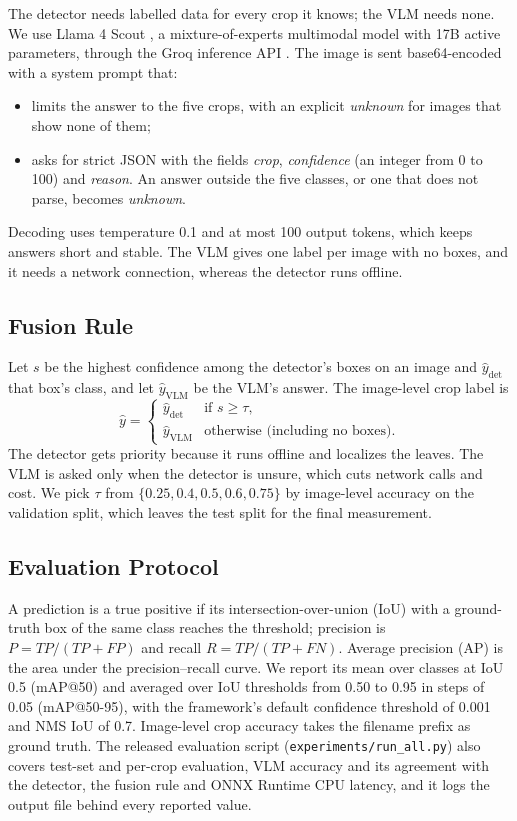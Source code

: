 \documentclass[conference]{IEEEtran}
\begin{document}
The detector needs labelled data for every crop it knows; the VLM needs none. We use Llama 4 Scout \cite{llama4}, a mixture-of-experts multimodal model with 17B active parameters, through the Groq inference API \cite{groq}. The image is sent base64-encoded with a system prompt that:
\begin{itemize}
\item limits the answer to the five crops, with an explicit \textit{unknown} for images that show none of them;
\item asks for strict JSON with the fields \textit{crop}, \textit{confidence} (an integer from 0 to 100) and \textit{reason}. An answer outside the five classes, or one that does not parse, becomes \textit{unknown}.
\end{itemize}
Decoding uses temperature 0.1 and at most 100 output tokens, which keeps answers short and stable. The VLM gives one label per image with no boxes, and it needs a network connection, whereas the detector runs offline.

\subsection{Fusion Rule}

Let $s$ be the highest confidence among the detector's boxes on an image and $\hat{y}_{\text{det}}$ that box's class, and let $\hat{y}_{\text{VLM}}$ be the VLM's answer. The image-level crop label is
\begin{equation}
\hat{y} = \begin{cases} \hat{y}_{\text{det}} & \text{if } s \ge \tau,\\ \hat{y}_{\text{VLM}} & \text{otherwise (including no boxes).} \end{cases}
\end{equation}
The detector gets priority because it runs offline and localizes the leaves. The VLM is asked only when the detector is unsure, which cuts network calls and cost. We pick $\tau$ from $\{0.25, 0.4, 0.5, 0.6, 0.75\}$ by image-level accuracy on the validation split, which leaves the test split for the final measurement.

\subsection{Evaluation Protocol}

A prediction is a true positive if its intersection-over-union (IoU) with a ground-truth box of the same class reaches the threshold; precision is $P = TP/(TP+FP)$ and recall $R = TP/(TP+FN)$. Average precision (AP) is the area under the precision--recall curve. We report its mean over classes at IoU 0.5 (mAP@50) and averaged over IoU thresholds from 0.50 to 0.95 in steps of 0.05 (mAP@50-95), with the framework's default confidence threshold of 0.001 and NMS IoU of 0.7. Image-level crop accuracy takes the filename prefix as ground truth. The released evaluation script (\texttt{experiments/run\_all.py}) also covers test-set and per-crop evaluation, VLM accuracy and its agreement with the detector, the fusion rule and ONNX Runtime CPU latency, and it logs the output file behind every reported value.
\end{document}
